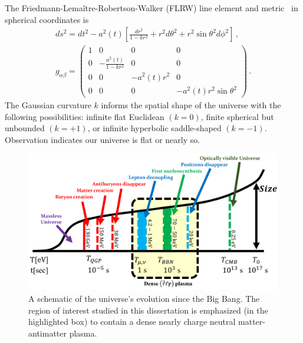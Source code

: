 The Friedmann-Lema{\^i}tre-Robertson-Walker (FLRW) line element and metric~\cite{weinberg1972gravitation} in spherical coordinates is
\begin{gather}
 \label{FLRW} ds^2=dt^2-a^2(t)\left[\frac{dr^2}{1-kr^{2}}+r^{2}d\theta^2+r^{2}\sin\theta^{2}d\phi^2\right]\,,\\
 g_{\alpha\beta}=
 \begin{pmatrix}
  1&0&0&0\\
  0&-\frac{a^{2}(t)}{1-kr^{2}}&0&0\\
  0&0&-a^{2}(t)r^{2}&0\\
  0&0&0&-a^{2}(t)r^{2}\sin\theta^{2}
 \end{pmatrix}\,.
\end{gather}
The Gaussian curvature $k$ informs the spatial shape of the universe with the following possibilities: infinite flat Euclidean $(k=0)$, finite spherical but unbounded $(k=+1)$, or infinite hyperbolic saddle-shaped $(k=-1)$. Observation indicates our universe is flat or nearly so.


\begin{figure}[ht]
 \centering
 \includegraphics[width=0.95\linewidth]{plots/chap01intro/thesis_universe.png}
 \caption{A schematic of the universe's evolution since the Big Bang. The region of interest studied in this dissertation is emphasized (in the highlighted box) to contain a dense nearly charge neutral matter-antimatter plasma.}
 \label{fig:cosmo} 
\end{figure}

